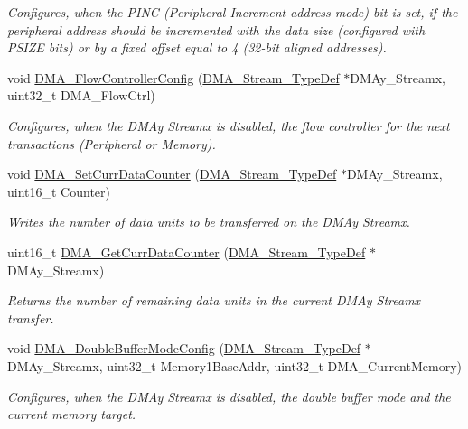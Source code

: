 \begin{DoxyCompactItemize}
\begin{DoxyCompactList}\small\item\em Configures, when the P\+I\+NC (Peripheral Increment address mode) bit is set, if the peripheral address should be incremented with the data size (configured with P\+S\+I\+ZE bits) or by a fixed offset equal to 4 (32-\/bit aligned addresses). \end{DoxyCompactList}\item 
void \hyperlink{group___d_m_a_ga77f7628f6be9d6d088127eceb090b8b2}{D\+M\+A\+\_\+\+Flow\+Controller\+Config} (\hyperlink{struct_d_m_a___stream___type_def}{D\+M\+A\+\_\+\+Stream\+\_\+\+Type\+Def} $\ast$D\+M\+Ay\+\_\+\+Streamx, uint32\+\_\+t D\+M\+A\+\_\+\+Flow\+Ctrl)
\begin{DoxyCompactList}\small\item\em Configures, when the D\+M\+Ay Streamx is disabled, the flow controller for the next transactions (Peripheral or Memory). \end{DoxyCompactList}\item 
void \hyperlink{group___d_m_a_ga6a11a2c951cff59b125ba8857d44e3f3}{D\+M\+A\+\_\+\+Set\+Curr\+Data\+Counter} (\hyperlink{struct_d_m_a___stream___type_def}{D\+M\+A\+\_\+\+Stream\+\_\+\+Type\+Def} $\ast$D\+M\+Ay\+\_\+\+Streamx, uint16\+\_\+t Counter)
\begin{DoxyCompactList}\small\item\em Writes the number of data units to be transferred on the D\+M\+Ay Streamx. \end{DoxyCompactList}\item 
uint16\+\_\+t \hyperlink{group___d_m_a_ga4a76444a92423f5f15a4328738d6dc46}{D\+M\+A\+\_\+\+Get\+Curr\+Data\+Counter} (\hyperlink{struct_d_m_a___stream___type_def}{D\+M\+A\+\_\+\+Stream\+\_\+\+Type\+Def} $\ast$D\+M\+Ay\+\_\+\+Streamx)
\begin{DoxyCompactList}\small\item\em Returns the number of remaining data units in the current D\+M\+Ay Streamx transfer. \end{DoxyCompactList}\item 
void \hyperlink{group___d_m_a_ga8d0957e50302efaf48a16c62d14c9ca8}{D\+M\+A\+\_\+\+Double\+Buffer\+Mode\+Config} (\hyperlink{struct_d_m_a___stream___type_def}{D\+M\+A\+\_\+\+Stream\+\_\+\+Type\+Def} $\ast$D\+M\+Ay\+\_\+\+Streamx, uint32\+\_\+t Memory1\+Base\+Addr, uint32\+\_\+t D\+M\+A\+\_\+\+Current\+Memory)
\begin{DoxyCompactList}\small\item\em Configures, when the D\+M\+Ay Streamx is disabled, the double buffer mode and the current memory target. \end{DoxyCompactList}\item 

\end{DoxyCompactItemize}
